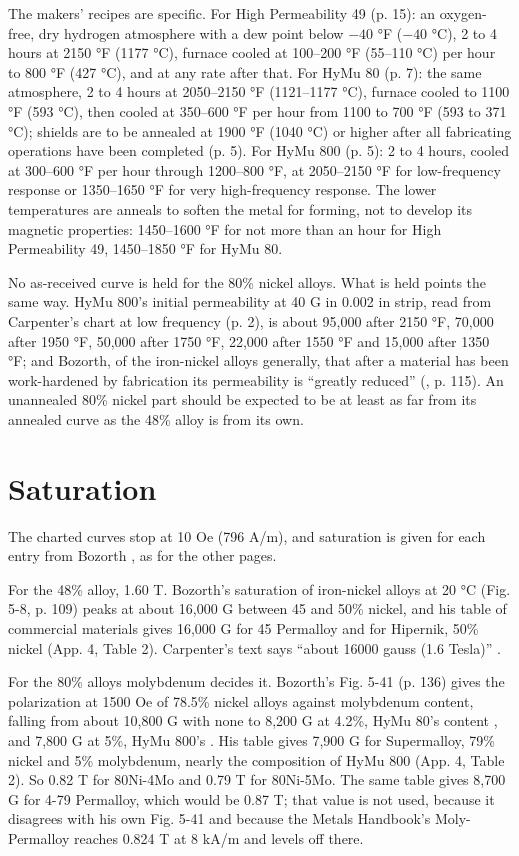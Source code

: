 \documentclass[
  11pt,
]{article}
\newcounter{none} %
\begin{document}
The makers' recipes are specific. For High Permeability 49 (p. 15): an oxygen-free, dry hydrogen atmosphere with a dew point below $-40$ °F ($-40$ °C), 2 to 4 hours at 2150 °F (1177 °C), furnace cooled at 100--200 °F (55--110 °C) per hour to 800 °F (427 °C), and at any rate after that. For HyMu 80 \cite{carpenter-hymu80} (p. 7): the same atmosphere, 2 to 4 hours at 2050--2150 °F (1121--1177 °C), furnace cooled to 1100 °F (593 °C), then cooled at 350--600 °F per hour from 1100 to 700 °F (593 to 371 °C); shields are to be annealed at 1900 °F (1040 °C) or higher after all fabricating operations have been completed (p. 5). For HyMu 800 \cite{carpenter-hymu800} (p. 5): 2 to 4 hours, cooled at 300--600 °F per hour through 1200--800 °F, at 2050--2150 °F for low-frequency response or 1350--1650 °F for very high-frequency response. The lower temperatures are anneals to soften the metal for forming, not to develop its magnetic properties: 1450--1600 °F for not more than an hour for High Permeability 49, 1450--1850 °F for HyMu 80.

No as-received curve is held for the 80\% nickel alloys. What is held points the same way. HyMu 800's initial permeability at 40 G in 0.002 in strip, read from Carpenter's chart at low frequency (p. 2), is about 95,000 after 2150 °F, 70,000 after 1950 °F, 50,000 after 1750 °F, 22,000 after 1550 °F and 15,000 after 1350 °F; and Bozorth, of the iron-nickel alloys generally, that after a material has been work-hardened by fabrication its permeability is ``greatly reduced'' (\cite{bozorth1951}, p. 115). An unannealed 80\% nickel part should be expected to be at least as far from its annealed curve as the 48\% alloy is from its own.

\section{Saturation}\label{saturation}

The charted curves stop at 10 Oe (796 A/m), and saturation is given for each entry from Bozorth \cite{bozorth1951}, as for the other pages.

For the 48\% alloy, 1.60 T. Bozorth's saturation of iron-nickel alloys at 20 °C (Fig. 5-8, p. 109) peaks at about 16,000 G between 45 and 50\% nickel, and his table of commercial materials gives 16,000 G for 45 Permalloy and for Hipernik, 50\% nickel (App. 4, Table 2). Carpenter's text says ``about 16000 gauss (1.6 Tesla)'' \cite{carpenter-hp49}.

For the 80\% alloys molybdenum decides it. Bozorth's Fig. 5-41 (p. 136) gives the polarization at 1500 Oe of 78.5\% nickel alloys against molybdenum content, falling from about 10,800 G with none to 8,200 G at 4.2\%, HyMu 80's content \cite{carpenter-hymu80}, and 7,800 G at 5\%, HyMu 800's \cite{carpenter-hymu800}. His table gives 7,900 G for Supermalloy, 79\% nickel and 5\% molybdenum, nearly the composition of HyMu 800 (App. 4, Table 2). So 0.82 T for 80Ni-4Mo and 0.79 T for 80Ni-5Mo. The same table gives 8,700 G for 4-79 Permalloy, which would be 0.87 T; that value is not used, because it disagrees with his own Fig. 5-41 and because the Metals Handbook's Moly-Permalloy reaches 0.824 T at 8 kA/m and levels off there.
\end{document}
